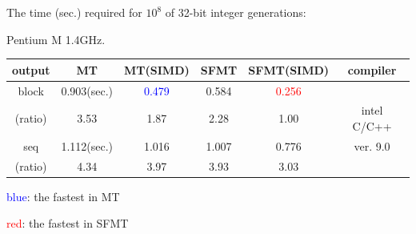 \documentclass[a4j,12pt,landscape]{jarticle}
\begin{document}
\newpage
\begin{center}
The time (sec.) required for $10^8$ 
of 32-bit integer generations:

Pentium M 1.4GHz. 

\vskip 2mm
\begin{tabular}{|c||c|c|c|c|c|}
\hline
output & MT & MT{\Large(SIMD)} & SFMT & SFMT{\Large (SIMD)} & compiler
 \\ \hline \hline
 block   & 0.903(sec.) & \textcolor{blue}{0.479}
 & 0.584 & \textcolor{red}{0.256} &    \\ \cline{2-5}
 (ratio) & 3.53\phantom{0}  & 1.87\phantom{0}  & 2.28\phantom{0}  & 1.00\phantom{0}  & intel C/C++ \\ \cline{1-5}
 seq     & 1.112(sec.) & 1.016 & 1.007 & 0.776 & ver. 9.0\\ \cline{2-5}
 (ratio) & 4.34\phantom{0} & 3.97\phantom{0}  & 3.93\phantom{0}  & 3.03\phantom{0}  &  \\ \hline
\end{tabular}
\end{center}

\textcolor{blue}{blue}: the fastest in MT

\textcolor{red}{red}: the fastest in SFMT
\end{document}
